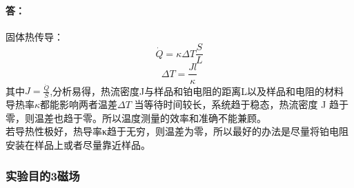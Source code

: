 \documentclass{ctexart}                                     %
\theoremstyle{ansstyle}
\begin{document}
\begin{enumerate}
          \paragraph{答：}固体热传导：
          $$\dot{Q}=\kappa \Delta T\frac{S}{L}$$
          $$\Delta T=\frac{Jl}{\kappa}$$
          其中$J=\frac{\dot{Q}}{S}$,分析易得，热流密度J与样品和铂电阻的距离L以及样品和电阻的材料导热率$\kappa$都能影响两者温差$\Delta T$
          当等待时间较长，系统趋于稳态，热流密度 J 趋于零，则温差也趋于零。所以温度测量的效率和准确不能兼顾。\\
          若导热性极好，热导率κ趋于无穷，则温差为零，所以最好的办法是尽量将铂电阻安装在样品上或者尽量靠近样品。
\end{enumerate}
\subsubsection{实验目的3磁场}
\end{document}
